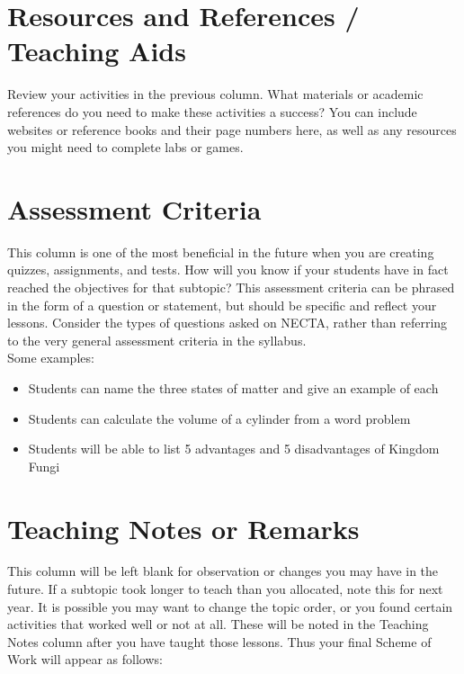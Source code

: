 \section{Resources and References / Teaching Aids}
Review your activities in the previous column.  What materials or academic references do you need to make these activities a success?  You can include websites or reference books and their page numbers here, as well as any resources you might need to complete labs or games.

\section{Assessment Criteria}
This column is one of the most beneficial in the future when you are creating quizzes, assignments, and tests.  How will you know if your students have in fact reached the objectives for that subtopic?  This assessment criteria can be phrased in the form of a question or statement, but should be specific and reflect your lessons.  Consider the types of questions asked on NECTA, rather than referring to the very general assessment criteria in the syllabus.\\
Some examples: 
\begin{itemize}
\item Students can name the three states of matter and give an example of each
\item Students can calculate the volume of a cylinder from a word problem
\item Students will be able to list 5 advantages and 5 disadvantages of Kingdom Fungi
\end{itemize}
  

\section{Teaching Notes or Remarks}
This column will be left blank for observation or changes you may have in the future.  If a subtopic took longer to teach than you allocated, note this for next year.  It is possible you may want to change the topic order, or you found certain activities that worked well or not at all.  These will be noted in the Teaching Notes column after you have taught those lessons.  
Thus your final Scheme of Work will appear as follows:

